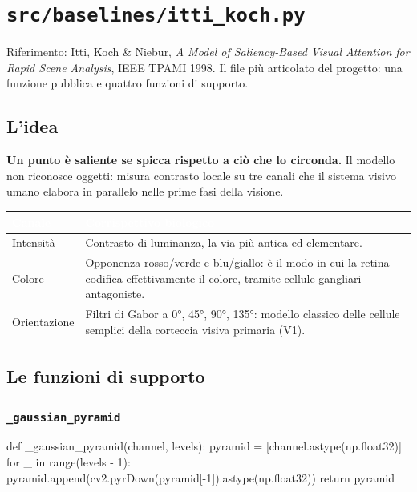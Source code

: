 \section{\texttt{src/baselines/itti\_koch.py}}

Riferimento: Itti, Koch \& Niebur, \emph{A Model of Saliency-Based Visual Attention for Rapid
Scene Analysis}, IEEE TPAMI 1998. Il file più articolato del progetto: una funzione pubblica e
quattro funzioni di supporto.

\subsection{L'idea}

\textbf{Un punto è saliente se spicca rispetto a ciò che lo circonda.} Il modello non riconosce
oggetti: misura contrasto locale su tre canali che il sistema visivo umano elabora in parallelo
nelle prime fasi della visione.

\begin{center}
\begin{tabular}{l p{9.4cm}}
\toprule
\rowcolor{tblHead}\textcolor{white}{\textbf{Canale}} & \textcolor{white}{\textbf{Corrispettivo biologico}} \\
\midrule
Intensità & Contrasto di luminanza, la via più antica ed elementare. \\
\rowcolor{tblAlt} Colore & Opponenza rosso/verde e blu/giallo: è il modo in cui la retina codifica
effettivamente il colore, tramite cellule gangliari antagoniste. \\
Orientazione & Filtri di Gabor a 0°, 45°, 90°, 135°: modello classico delle cellule semplici
della corteccia visiva primaria (V1). \\
\bottomrule
\end{tabular}
\end{center}

\subsection{Le funzioni di supporto}

\subsubsection{\texttt{\_gaussian\_pyramid}}

\begin{idebox}
\begin{pycode}
def _gaussian_pyramid(channel, levels):
    pyramid = [channel.astype(np.float32)]
    for _ in range(levels - 1):
        pyramid.append(cv2.pyrDown(pyramid[-1]).astype(np.float32))
    return pyramid
\end{pycode}
\end{idebox}

